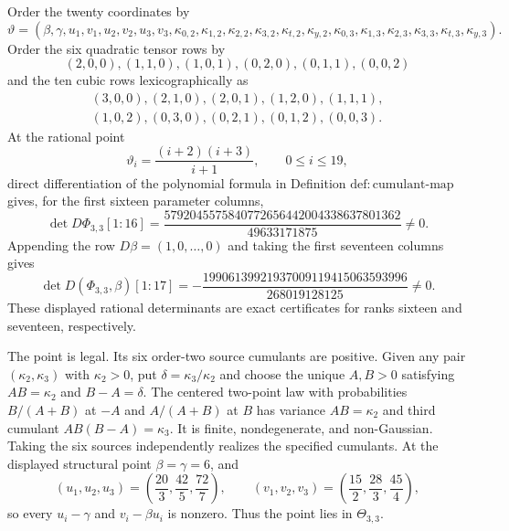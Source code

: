 Order the twenty coordinates by
\[
 \vartheta=(\beta,\gamma,u_1,v_1,u_2,v_2,u_3,v_3,
 \kappa_{0,2},\kappa_{1,2},\kappa_{2,2},\kappa_{3,2},\kappa_{t,2},\kappa_{y,2},
 \kappa_{0,3},\kappa_{1,3},\kappa_{2,3},\kappa_{3,3},\kappa_{t,3},\kappa_{y,3}).
\]
Order the six quadratic tensor rows by
\[
 (2,0,0),(1,1,0),(1,0,1),(0,2,0),(0,1,1),(0,0,2)
\]
and the ten cubic rows lexicographically as
\[
\begin{gathered}
 (3,0,0),(2,1,0),(2,0,1),(1,2,0),(1,1,1),\\
 (1,0,2),(0,3,0),(0,2,1),(0,1,2),(0,0,3).
\end{gathered}
\]
At the rational point
\[
 \vartheta_i=\frac{(i+2)(i+3)}{i+1},\qquad 0\le i\le19,
\]
direct differentiation of the polynomial formula in Definition \(\mathrm{def:cumulant\mbox{-}map}\) gives, for the first sixteen parameter columns,
\[
 \det D\Phi_{3,3}[1{:}16]
 =\frac{5792045575840772656442004338637801362}{49633171875}\ne0.
\]
Appending the row \(D\beta=(1,0,\ldots,0)\) and taking the first seventeen columns gives
\[
 \det D(\Phi_{3,3},\beta)[1{:}17]
 =-\frac{19906139921937009119415063593996}{268019128125}\ne0.
\]
These displayed rational determinants are exact certificates for ranks sixteen and seventeen, respectively.

The point is legal.  Its six order-two source cumulants are positive.  Given any pair \((\kappa_2,\kappa_3)\) with \(\kappa_2>0\), put \(\delta=\kappa_3/\kappa_2\) and choose the unique \(A,B>0\) satisfying \(AB=\kappa_2\) and \(B-A=\delta\).  The centered two-point law with probabilities \(B/(A+B)\) at \(-A\) and \(A/(A+B)\) at \(B\) has variance \(AB=\kappa_2\) and third cumulant \(AB(B-A)=\kappa_3\).  It is finite, nondegenerate, and non-Gaussian.  Taking the six sources independently realizes the specified cumulants.  At the displayed structural point \(\beta=\gamma=6\), and
\[
 (u_1,u_2,u_3)=\left(\frac{20}{3},\frac{42}{5},\frac{72}{7}\right),
 \qquad
 (v_1,v_2,v_3)=\left(\frac{15}{2},\frac{28}{3},\frac{45}{4}\right),
\]
so every \(u_i-\gamma\) and \(v_i-\beta u_i\) is nonzero.  Thus the point lies in \(\Theta_{3,3}\).

